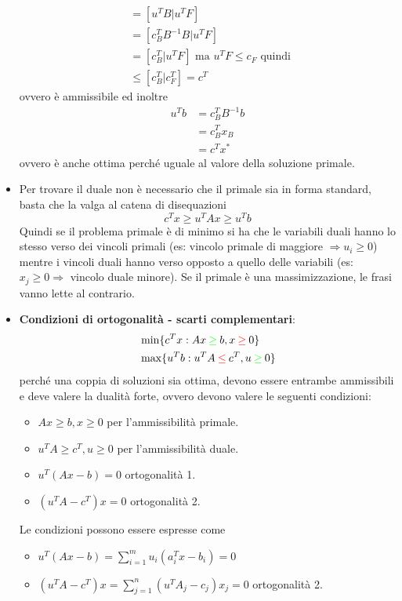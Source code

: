 \begin{itemize}
\begin{align*}
		      &= [u^TB | u^T F] \\
		      &= [c_{B}^TB^{-1} B | u^T F] \\
		      &= [c_{B}^T | u^T F] \text{ ma $u^T F \leq c_F$ quindi }\\
		      &\leq [c_{B}^T | c_{F}^T] = c^T
	\end{align*}
	ovvero è ammissibile ed inoltre
	\begin{align*}
		u^T b &= c_{B}^TB^{-1}b \\
		      &= c_{B}^T x_B \\
		      &= c^T x^*
	\end{align*}
	ovvero è anche ottima perché uguale al valore della soluzione primale.
	\item Per trovare il duale non è necessario che il primale sia in forma standard, basta che la valga al catena di disequazioni
	$$
	c^T x \geq u^T A x \geq u^T b
	$$
	Quindi se il problema primale è di minimo si ha che le variabili duali hanno lo stesso verso dei vincoli primali (es: vincolo primale di maggiore $\Rightarrow u_i \geq 0$) mentre i vincoli duali hanno verso opposto a quello delle variabili (es: $x_j \geq 0 \Rightarrow$ vincolo duale minore). Se il primale è una massimizzazione, le frasi vanno lette al contrario.
	\item \textbf{Condizioni di ortogonalità - scarti complementari}:
	\begin{align*}
		&\min \{ c^T x : Ax \mathbin{\textcolor{green}{\geq}} b, x \mathbin{\textcolor{red}{\geq}} 0 \} \\
		&\max \{ u^T b : u^TA \mathbin{\textcolor{red}{\leq}} c^T, u \mathbin{\textcolor{green}{\geq}} 0 \}
	\end{align*}
	perché una coppia di soluzioni sia ottima, devono essere entrambe ammissibili e deve valere la dualità forte, ovvero devono valere le seguenti condizioni:
	\begin{itemize}
		\item $Ax \geq b, x \geq 0$ per l'ammissibilità primale.
		\item $u^TA \geq c^T, u \geq 0$ per l'ammissibilità duale.
		\item $u^T(Ax-b) = 0$ ortogonalità 1.
		\item $(u^T A - c^T)x = 0$ ortogonalità 2.
	\end{itemize}
	Le condizioni possono essere espresse come
	\begin{itemize}
		\item $u^T(Ax-b) = \sum\limits_{i = 1}^m u_i (a_{i}^Tx - b_i) = 0$
		\item $(u^T A - c^T)x = \sum\limits_{j = 1 }^n (u^T A_{j} - c_{j})x_j = 0$ ortogonalità 2.

\end{itemize}
\end{itemize}
